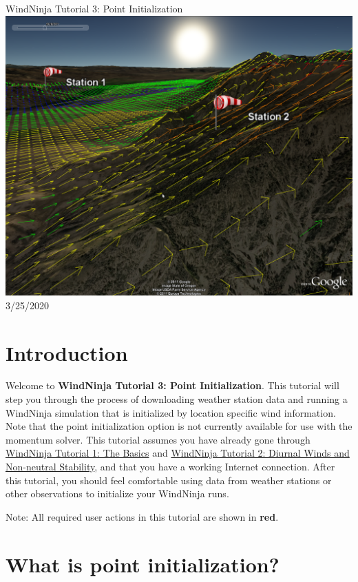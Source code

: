 \documentclass[12pt]{article}
\begin{document}
\begin{titlepage}
    \centering
    {\Huge
       WindNinja Tutorial 3: Point Initialization
    }    
    \vfill
    \includegraphics[scale=0.35]							{title_fig}
    \vfill
  	{\Huge
	  3/25/2020 %
  	}
    \vfill
\end{titlepage}
\section*{Introduction}

Welcome to \textbf{WindNinja Tutorial 3: Point Initialization}.  This tutorial will step you through the process of downloading weather station data and running a WindNinja simulation that is initialized by location specific wind information.  Note that the point initialization option is not currently available for use with the momentum solver. This tutorial assumes you have already gone through \href{https://weather.firelab.org/windninja/tutorials/WindNinja_tutorial1.pdf}{WindNinja Tutorial 1: The Basics} and \href{https://weather.firelab.org/windninja/tutorials/WindNinja_tutorial2.pdf}{WindNinja Tutorial 2: Diurnal Winds and Non-neutral Stability}, and that you have a working Internet connection. After this tutorial, you should feel comfortable using data from weather stations or other observations to initialize your WindNinja runs.

Note:  All required user actions in this tutorial are shown in \textbf{\color{red}red}.

\section*{What is point initialization?}
\end{document}
